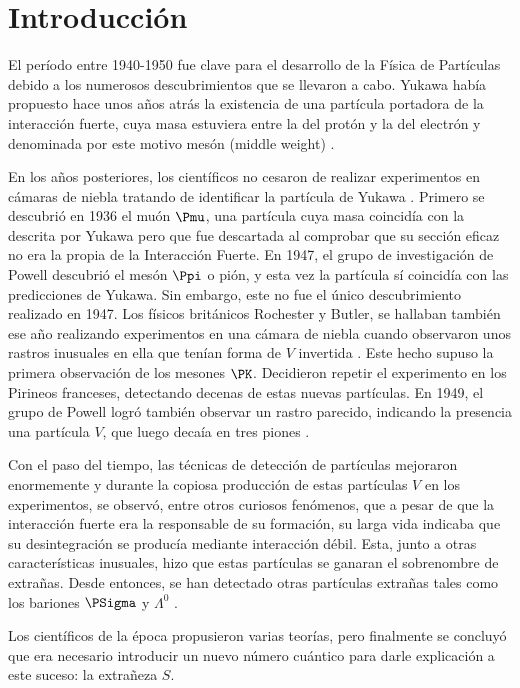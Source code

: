 \renewcommand{\listtablename}{Índice de tablas}
\renewcommand{\tablename}{Tabla}

\chapter{Introducción}\label{cap:intro}
El período entre 1940-1950 fue clave para el desarrollo de la Física de Partículas debido a los numerosos descubrimientos que se llevaron a cabo. Yukawa había propuesto hace unos años atrás la existencia de una partícula portadora de la interacción fuerte, cuya masa estuviera entre la del protón y la del electrón y denominada por este motivo mesón (middle weight) \cite{Griffiths2008}.
 
En los años posteriores, los científicos no cesaron de realizar experimentos en cámaras de niebla tratando de identificar la partícula de Yukawa \cite{Lattes}. Primero se descubrió en 1936 el muón $\Pmu$, una partícula cuya masa coincidía con la descrita por Yukawa pero que fue descartada al comprobar que su sección eficaz no era la propia de la Interacción Fuerte. En 1947, el grupo de investigación de Powell descubrió el mesón $\Ppi$ o pión, y esta vez la partícula sí coincidía con las predicciones de Yukawa. Sin embargo, este no fue el único descubrimiento realizado en 1947. Los físicos británicos Rochester y Butler, se hallaban también ese año realizando experimentos en una cámara de niebla cuando observaron unos rastros inusuales en ella que tenían forma de $V$ invertida \cite{Nature1}. Este hecho supuso la primera observación de los mesones $\PK$. Decidieron repetir el experimento en los Pirineos franceses, detectando decenas de estas nuevas partículas. En 1949, el grupo de Powell logró también observar un rastro parecido, indicando la presencia una partícula $V$, que luego decaía en tres piones \cite{Powell}. 

Con el paso del tiempo, las técnicas de detección de partículas mejoraron enormemente y durante la copiosa producción de estas partículas $V$ en los experimentos, se observó, entre otros curiosos fenómenos, que a pesar de que la interacción fuerte era la responsable de su formación, su larga vida indicaba que su desintegración se producía mediante interacción débil. Esta, junto a otras características inusuales, hizo que estas partículas se ganaran el sobrenombre de extrañas. Desde entonces, se han detectado otras partículas extrañas tales como los bariones $\PSigma$ y $\Lambda^0$ \cite{Bardeen2012}.

Los científicos de la época propusieron varias teorías, pero finalmente se concluyó que era necesario introducir un nuevo número cuántico para darle explicación a este suceso: la extrañeza $S$. 

